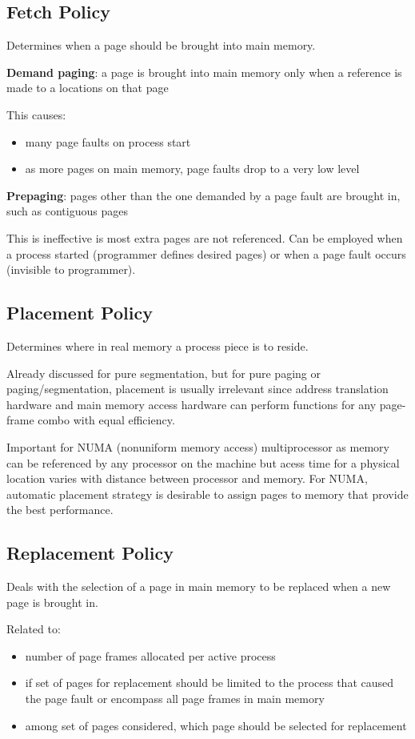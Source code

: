 \documentclass[11pt]{article}
\begin{document}
\subsection{Fetch Policy}
\label{sec:org9be5f21}
Determines when a page should be brought into main memory.

\textbf{Demand paging}: a page is brought into main memory only when a reference is made to a
locations on that page

This causes:
\begin{itemize}
\item many page faults on process start
\item as more pages on main memory, page faults drop to a very low level
\end{itemize}

\textbf{Prepaging}: pages other than the one demanded by a page fault are brought in, such as
contiguous pages

This is ineffective is most extra pages are not referenced.
Can be employed when a process started (programmer defines desired pages) or when a page
fault occurs (invisible to programmer).
\subsection{Placement Policy}
\label{sec:orgfa7d5d0}
Determines where in real memory a process piece is to reside.

Already discussed for pure segmentation, but for pure paging or paging/segmentation,
placement is usually irrelevant since address translation hardware and main memory
access hardware can perform functions for any page-frame combo with equal efficiency.

Important for NUMA (nonuniform memory access) multiprocessor as memory can be
referenced by any processor on the machine but acess time for a physical location
varies with distance between processor and memory.
For NUMA, automatic placement strategy is desirable to assign pages to memory that
provide the best performance.
\subsection{Replacement Policy}
\label{sec:org61ee788}
Deals with the selection of a page in main memory to be replaced when a new page is
brought in.

Related to:
\begin{itemize}
\item number of page frames allocated per active process
\item if set of pages for replacement should be limited to the process that caused the
page fault or encompass all page frames in main memory
\item among set of pages considered, which page should be selected for replacement
\end{itemize}
\end{document}
